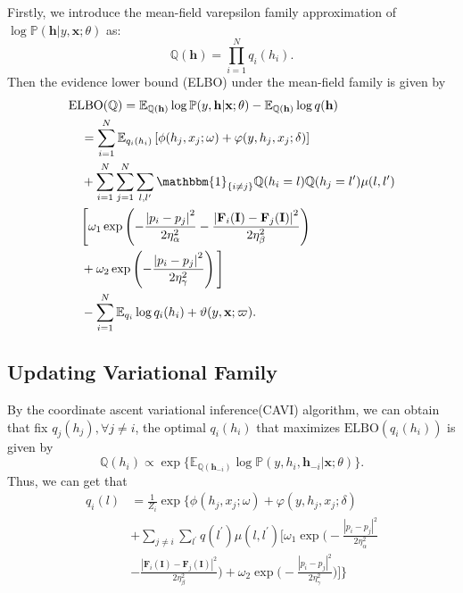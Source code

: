 \documentclass[conference]{IEEEtran}
\newcommand{\EE}{{\mathbb{E}}}
\newcommand{\PP}{{\mathbb{P}}}
\newcommand{\QQ}{{\mathbb{Q}}}
\newcommand{\Fb}{\mathbf{F}}
\newcommand{\Ib}{\mathbf{I}}
\newcommand{\hb}{\mathbf{h}}
\newcommand{\xb}{\mathbf{x}}
\newcommand{\one}{\mathbbm{1}}
\begin{document}
Firstly, we introduce the mean-field varepsilon family approximation of
$\log\PP(\hb \vert y, \xb; \theta)$ as:
\begin{equation*}
\QQ(\hb) = \prod_{i=1}^N q_i(h_i).
\end{equation*}
Then the evidence lower bound (ELBO) under the mean-field family is given by
\begin{equation}
\begin{split}
& \textrm{ELBO}(\QQ) = \EE_{\QQ(\hb)} \log\PP(y, \hb \vert \xb; \theta)
- \EE_{\QQ(\hb)} \log q(\hb) \\
&\quad = \sum_{i=1}^N \EE_{q_i(h_i)}
\left[ \phi(h_j, x_j; \omega) + \varphi(y, h_j, x_j; \delta) \right] \\
&\quad + \sum_{i=1}^N \sum_{j=1}^N \sum_{l,l^\prime} \one_{\{i \neq j\}} 
\QQ(h_i = l) \QQ(h_j = l^\prime) \mu(l, l^\prime) \\
&\quad \Bigg[ \omega_1 \exp \left(
- \frac{\left\lvert p_i - p_j \right\rvert^2}{2\eta_\alpha^2}
- \frac{\left\lvert \Fb_i(\Ib) - \Fb_j(\Ib) \right\rvert^2}{2\eta_\beta^2}
\right) \\
&\quad + \omega_2 \exp \left(
- \frac{\left\lvert p_i - p_j \right\rvert^2}{2\eta_\gamma^2}
\right) \Bigg] \\
&\quad - \sum_{i=1}^N \EE_{q_i} \log q_i(h_i) + \vartheta(y, \xb; \varpi).
\end{split}
\end{equation}


\subsection{Updating Variational Family}


By the coordinate ascent variational inference(CAVI) algorithm,
we can obtain that fix $q_j(h_j), \forall j \neq i$, the optimal $q_i(h_i)$
that maximizes $\textrm{ELBO}(q_i(h_i))$ is given by
\begin{equation}
\QQ(h_i) \propto \exp\{\EE_{\QQ(\hb_{-i})}
\log\PP(y, h_i, \hb_{-i} \vert \xb; \theta)\}.
\end{equation}
Thus, we can get that
\begin{equation}
\begin{split}
q_i(l) &= \frac{1}{Z_i} \exp \Bigg\{
\phi(h_j, x_j; \omega) + \varphi(y, h_j, x_j; \delta) \\
&+ \sum_{j \neq i} \sum_{l^\prime} q(l^\prime) \mu(l, l^\prime) 
\Bigg[ \omega_1 \exp \big(
- \frac{\left\lvert p_i - p_j \right\rvert^2}{2\eta_\alpha^2}\\
&- \frac{\left\lvert \Fb_i(\Ib) - \Fb_j(\Ib) \right\rvert^2}{2\eta_\beta^2}
\big)
+ \omega_2 \exp \big(
- \frac{\left\lvert p_i - p_j 
\right\rvert^2}{2\eta_\gamma^2}
\big)
\Bigg]
\Bigg\}
\end{split}
\end{equation}
\end{document}

